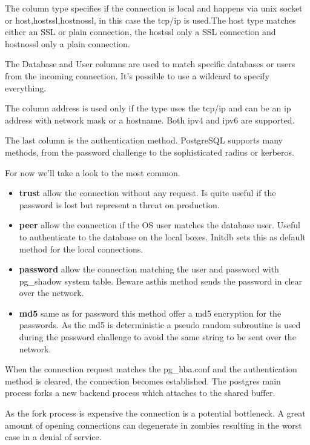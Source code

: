 The column type specifies if the connection is local and happens via unix 
socket or host,hostssl,hostnossl, in this case the tcp/ip is used.The host 
type matches either an SSL or plain connection, the hostssl only a SSL 
connection and hostnossl only a plain connection.

The Database and User columns are used to match specific databases or 
users from the incoming connection. It's possible to use a wildcard to specify 
everything. 

The column address is used only if the type uses the tcp/ip and can be an ip 
address with network mask or a hostname. Both ipv4 and ipv6 are supported.

The last column is the authentication method. PostgreSQL supports many 
methods, from the password challenge to the sophisticated radius or kerberos.

For now we'll take a look to the most common.

\begin{itemize}
 \item \textbf{trust} allow the connection without any request. Is quite useful 
if the password is lost but represent a threat on production.

\item \textbf{peer} allow the connection if the OS user matches the 
database user. Useful to authenticate to the database on the local boxes. 
Initdb sets this as default method for the local connections.

\item \textbf{password} allow the connection matching the user and 
password with pg\_shadow system table. Beware asthis method sends the password 
in clear over the network.

\item \textbf{md5} same as for password this method offer a md5 encryption for 
the passwords. As the md5 is deterministic a pseudo random subroutine is used 
during the password challenge to avoid the same string to be sent over the 
network.

\end{itemize}

When the connection request matches the pg\_hba.conf and the authentication 
method is cleared, the connection becomes established. The postgres main 
process forks a new backend process which attaches to the shared buffer. 

As the fork process is expensive the connection is a potential bottleneck. 
A great amount of opening connections can degenerate in zombies 
resulting in the worst case in a denial of service.

